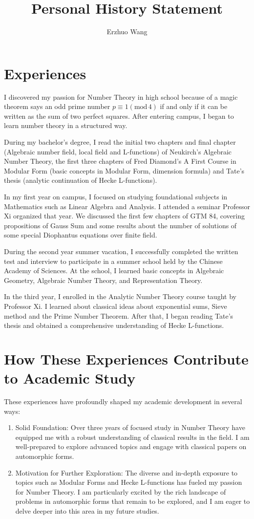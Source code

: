 \documentclass[12pt]{article}
\title{Personal History Statement}
\author{Erzhuo Wang}
\date{}
\renewcommand{\mod}[1]{(\text{mod}\,#1)}
\newenvironment{enu}{\begin{enumerate}[(1)]}{\end{enumerate}}
\theoremstyle{definition}
\begin{document}
\maketitle
\section{Experiences}
I discovered my passion for Number Theory in high school because of a magic theorem says an odd prime number 
$p \equiv 1\mod{4}$ if and only if it can be written as the sum of two perfect squares. 
After entering campus, I began to learn number theory in a structured way.

During my bachelor's degree,
I read the initial two chapters and final chapter (Algebraic number field, local field and L-functions) of Neukirch's Algebraic Number Theory, 
the first three chapters of Fred Diamond's A First Course in Modular Form (basic concepts in Modular Form, dimension formula)
and Tate's thesis (analytic continuation of Hecke L-functions).  

In my first year on campus, I focused on studying foundational subjects in Mathematics such as Linear Algebra and Analysis.
I attended a seminar Professor Xi organized that year. 
We discussed the first few chapters of GTM 84, covering propositions of Gauss Sum and some results about the number of 
solutions of some special
Diophantus equations over finite field. 

During the second year summer vacation, 
I successfully completed the written test and interview to participate in a summer school held by the Chinese Academy of Sciences. 
At the school, I learned basic concepts in Algebraic Geometry, Algebraic Number Theory, and Representation Theory. 

In the third year, I enrolled in the Analytic Number Theory course taught by Professor Xi. 
I learned about classical ideas about exponential sums, Sieve method and the Prime Number Theorem. 
After that, I began reading Tate's thesis and obtained a comprehensive understanding of Hecke L-functions. 

\section{How These Experiences Contribute to Academic Study}
These experiences have profoundly shaped my academic development in several ways:
\begin{enu} 
\item Solid Foundation: Over three years of focused study in Number Theory have equipped me with a robust understanding of classical results in the field. I am well-prepared to explore advanced topics and engage with classical papers on automorphic forms.

\item Motivation for Further Exploration: The diverse and in-depth exposure to topics such as Modular Forms and Hecke 
L-functions has fueled my passion for Number Theory. I am particularly excited by the rich landscape of problems in automorphic forms that remain to be explored, and I am eager to delve deeper into this area in my future studies.
\end{enu}
\end{document}
